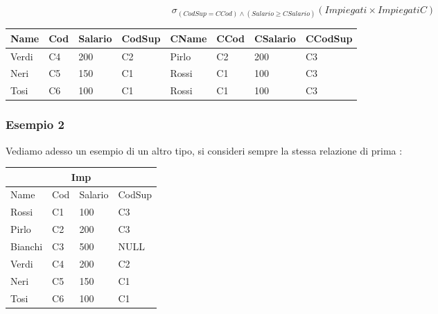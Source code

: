 \documentclass[12pt, letterpaper]{article}
\begin{document}
\begin{equation}
    \sigma_{(CodSup=CCod)\land(Salario\ge CSalario)}(Impiegati \times ImpiegatiC)
\end{equation}\begin{center}
    \begin{tabular}{|l|l|l|l|l|l|l|l|}
        \hline
        Name  & Cod & Salario & CodSup & CName & CCod & CSalario & CCodSup \\ \hline
        Verdi & C4  & 200     & C2     & Pirlo & C2   & 200      & C3      \\ \hline
        Neri  & C5  & 150     & C1     & Rossi & C1   & 100      & C3      \\ \hline
        Tosi  & C6  & 100     & C1     & Rossi & C1   & 100      & C3      \\ \hline
        \end{tabular}
\end{center}\subsubsection{Esempio 2}
Vediamo adesso un esempio di un altro tipo, si consideri sempre la stessa relazione di prima :
\begin{center}
    
    \begin{tabular}{|llll|}
    \hline
    \multicolumn{4}{|c|}{Imp}                                                                  \\ \hline
    \multicolumn{1}{|l|}{Name}    & \multicolumn{1}{l|}{Cod} & \multicolumn{1}{l|}{Salario} & CodSup \\ \hline
    \multicolumn{1}{|l|}{Rossi}   & \multicolumn{1}{l|}{C1}  & \multicolumn{1}{l|}{100}     & C3     \\ \hline
    \multicolumn{1}{|l|}{Pirlo}   & \multicolumn{1}{l|}{C2}  & \multicolumn{1}{l|}{200}     & C3     \\ \hline
    \multicolumn{1}{|l|}{Bianchi} & \multicolumn{1}{l|}{C3}  & \multicolumn{1}{l|}{500}     & NULL   \\ \hline
    \multicolumn{1}{|l|}{Verdi}   & \multicolumn{1}{l|}{C4}  & \multicolumn{1}{l|}{200}     & C2     \\ \hline
    \multicolumn{1}{|l|}{Neri}    & \multicolumn{1}{l|}{C5}  & \multicolumn{1}{l|}{150}     & C1     \\ \hline
    \multicolumn{1}{|l|}{Tosi}    & \multicolumn{1}{l|}{C6}  & \multicolumn{1}{l|}{100}     & C1     \\ \hline
    \end{tabular} 
\end{center}
\end{document}
